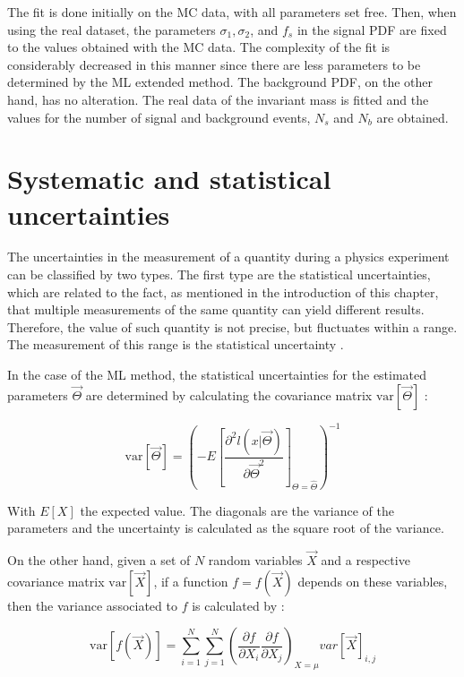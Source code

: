 The fit is done initially on the MC data, with all parameters set free. Then, when using the real dataset, the parameters $\sigma_1, \sigma_2$, and $f_s$ in the signal PDF are fixed to the values obtained with the MC data. The complexity of the fit is considerably decreased in this manner since there are less parameters to be determined by the ML extended method. The background PDF, on the other hand, has no alteration. The real data of the invariant mass is fitted and the values for the number of signal and background events, $N_s$ and $N_b$ are obtained. 

\section{Systematic and statistical uncertainties}
The uncertainties in the measurement of a quantity during a physics experiment can be classified by two types. The first type are the statistical uncertainties, which are related to the fact, as mentioned in the introduction of this chapter, that multiple measurements of the same quantity can yield different results. Therefore, the value of such quantity is not precise, but fluctuates within a range. The measurement of this range is the statistical uncertainty \cite{sinervo2003definition}. 

In the case of the ML method, the statistical uncertainties for the estimated parameters $\vec{\Theta}$ are determined by calculating the covariance matrix $\mathrm{var}[\vec{\Theta}]$ \cite{vsirca2016probability}:

\begin{equation}
	\mathrm{var}[\vec{\Theta}] = 
	\left(-E\left[ \frac{\partial^2 l(x | \vec{\Theta}) }{\partial \vec{\Theta} ^2}\right]_{\Theta = \hat{\Theta}}\right)^{-1}
\end{equation}

With $E[X]$ the expected value. The diagonals are the variance of the parameters and the uncertainty is calculated as the square root of the variance.

On the other hand, given a set of $N$ random variables $\vec{X}$ and a respective covariance matrix $\mathrm{var}[\vec{X}]$, if a function $f = f(\vec{X})$ depends on these variables, then the variance associated to $f$ is calculated by \cite{vsirca2016probability}:

\begin{equation}
	\mathrm{var}[f(\vec{X})] = \sum_{i=1}^N \sum_{j=1}^N \left(\frac{\partial f}{\partial X_i} \frac{\partial f}{\partial X_j} \right)_{X = \mu} var[\vec{X}]_{i,j}
\end{equation}

